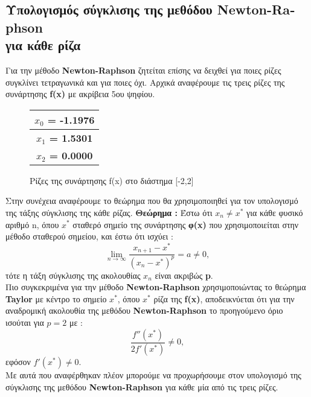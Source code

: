 \documentclass[First Project.tex]{subfiles}
\begin{document}
\subsection{Υπολογισμός σύγκλισης της μεθόδου \textlatin{\textbf{Newton-Raphson}} \\ για κάθε ρίζα}
    Για την μέθοδο \textlatin{\textbf{Newton-Raphson}} ζητείται επίσης να δειχθεί για ποιες ρίζες συγκλίνει τετραγωνικά και για ποιες όχι.
    Αρχικά αναφέρουμε τις τρεις ρίζες της συνάρτησης \textlatin{\textbf{f(x)}} με ακρίβεια 5ου ψηφίου.
    \vspace{10mm}
    \begin{figure}[h!]
        \centering
        \captionsetup{justification=centering}
        \begin{center}
            \begin{tabular}{ |c| }       
                \hline
                \textbf{$x_{0}$ = -1.1976} \\ \hline
                \textbf{$x_{1}$ = 1.5301} \\ \hline
                \textbf{$x_{2}$ = 0.0000} \\ 
                \hline
            \end{tabular}
            \caption{Ρίζες της συνάρτησης \textlatin{f(x)} στο διάστημα [-2,2]}
        \end{center}
    \end{figure}
    Στην συνέχεια αναφέρουμε το θεώρημα που θα χρησιμοποιηθεί για τον υπολογισμό της τάξης σύγκλισης της κάθε ρίζας.
    \large{\textbf{Θεώρημα : }} \normalsize Έστω ότι 
    \( x_{n} \neq x^{*} \)
    για κάθε φυσικό αριθμό \textlatin{n}, όπου $x^{*}$ σταθερό σημείο της συνάρτησης {\textbf{φ(\textlatin{x})}} που χρησιμοποιείται στην μέθοδο σταθερού 
    σημείου, και έστω ότι ισχύει :
    \begin{equation*}
        \lim_{n\to\infty} \frac{x_{n+1} - x^{*}}{(x_{n} - x^{*})^{p}} = a \neq  0 ,     
    \end{equation*}
    τότε η τάξη σύγκλισης της ακολουθίας $x_{n}$ είναι ακριβώς \textlatin{\textbf{p}}. \\ Πιο συγκεκριμένα για την μέθοδο 
    \textlatin{\textbf{Newton-Raphson}} χρησιμοποιώντας το θεώρημα \textlatin{\textbf{Taylor}} με κέντρο το σημείο \textlatin{\textbf{$x^{*}$}},
    όπου \textlatin{\textbf{$x^{*}$}} ρίζα της \textlatin{\textbf{f(x)}}, αποδεικνύεται ότι για την αναδρομική ακολουθία της μεθόδου 
    \textlatin{\textbf{Newton-Raphson}} το προηγούμενο όριο ισούται για \textlatin{\textbf{$p=2$}} με :
    \begin{equation*}
       \frac{f''(x^{*})}{2f'(x^{*})} \neq 0 ,
    \end{equation*}
    εφόσον \( f'(x^{*}) \neq 0\). \\
    Με αυτά που αναφέρθηκαν πλέον μπορούμε να προχωρήσουμε στον υπολογισμό της σύγκλισης της μεθόδου \textlatin{\textbf{Newton-Raphson}} για
    κάθε μία από τις τρεις ρίζες. \\ 
    
\end{document}

